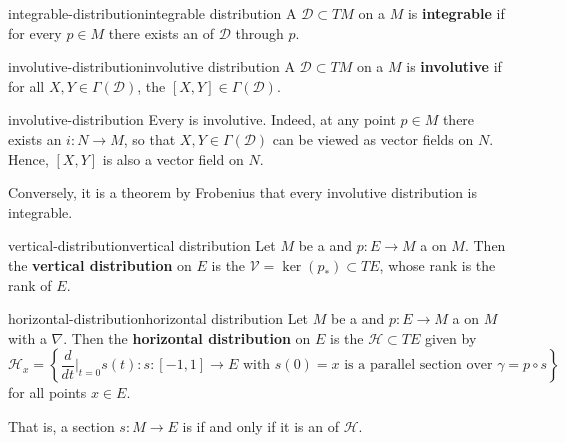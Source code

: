 \begin{topic}{integrable-distribution}{integrable distribution}
    A  $\mathcal{D} \subset TM$ on a  $M$ is \textbf{integrable} if for every $p \in M$ there exists an  of $\mathcal{D}$ through $p$.
\end{topic}

\begin{topic}{involutive-distribution}{involutive distribution}
    A  $\mathcal{D} \subset TM$ on a  $M$ is \textbf{involutive} if for all $X, Y \in \Gamma(\mathcal{D})$, the  $[X, Y] \in \Gamma(\mathcal{D})$.
\end{topic}

\begin{example}{involutive-distribution}
    Every  is involutive. Indeed, at any point $p \in M$ there exists an  $i : N \to M$, so that $X, Y \in \Gamma(\mathcal{D})$ can be viewed as vector fields on $N$. Hence, $[X, Y]$ is also a vector field on $N$.
    
    Conversely, it is a theorem by Frobenius that every involutive distribution is integrable.
\end{example}

\begin{topic}{vertical-distribution}{vertical distribution}
    Let $M$ be a  and $p : E \to M$ a  on $M$. Then the \textbf{vertical distribution} on $E$ is the  $\mathcal{V} = \ker(p_*) \subset TE$, whose rank is the rank of $E$.
\end{topic}

\begin{topic}{horizontal-distribution}{horizontal distribution}
    Let $M$ be a  and $p : E \to M$ a  on $M$ with a  $\nabla$. Then the \textbf{horizontal distribution} on $E$ is the  $\mathcal{H} \subset TE$ given by
    \[ \mathcal{H}_x = \left\{ \frac{d}{dt}\Big|_{t = 0} s(t) : s : [-1, 1] \to E \text{ with } s(0) = x \text{ is a parallel section over } \gamma = p \circ s \right\} \]
    for all points $x \in E$.
    
    That is, a section $s : M \to E$ is  if and only if it is an  of $\mathcal{H}$.
\end{topic}

